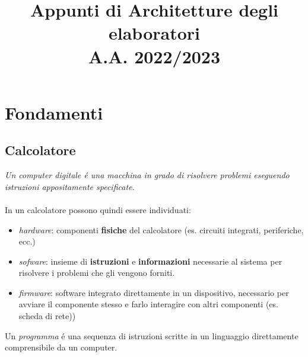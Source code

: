\documentclass{article}
\title{
	Appunti di Architetture degli elaboratori \\
	\large A.A. 2022/2023
}
\date{}
\begin{document}
\maketitle

\section{Fondamenti}
\subsection{Calcolatore}
\textit{Un computer digitale é una macchina in grado di risolvere problemi eseguendo istruzioni appositamente specificate.}\\\\
In un calcolatore possono quindi essere individuati:
\begin{itemize}
	\item \textit{hardware}: componenti \textbf{fisiche} del calcolatore (es. circuiti integrati, periferiche, ecc.)
	\item \textit{sofware}: insieme di \textbf{istruzioni} e \textbf{informazioni} necessarie al sistema per risolvere i problemi che gli vengono forniti.
	\item \textit{firmware}: software integrato direttamente in un dispositivo, necessario per avviare il componente stesso e farlo interagire con altri componenti (es. scheda di rete))
\end{itemize}
Un \textit{programma} é una sequenza di istruzioni scritte in un linguaggio direttamente comprensibile da un computer.
\end{document}
